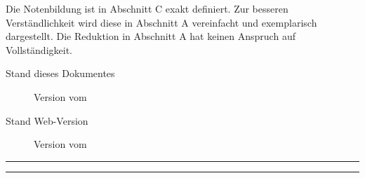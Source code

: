 \documentclass{article}
\newcommand{\versiondir}{_version}
\begin{document}
	\vspace*{-1cm}
	Die Notenbildung ist in Abschnitt C exakt definiert. Zur besseren Verständlichkeit wird diese in Abschnitt A vereinfacht und exemplarisch dargestellt. Die Reduktion in Abschnitt A hat keinen Anspruch auf Vollständigkeit.

	\begin{description}
		\item[Stand dieses Dokumentes] Version   vom 
		\item[Stand Web-Version] Version  vom 
	\end{description}
		
	\rule{\linewidth}{2pt}
	\renewcommand{\contentsname}{Abschnitte der Notentransparenz}
	\tableofcontents
	\rule{\linewidth}{2pt}
	
	
	
	\vspace{0.5cm}

	

	\clearpage
	
\end{document}
